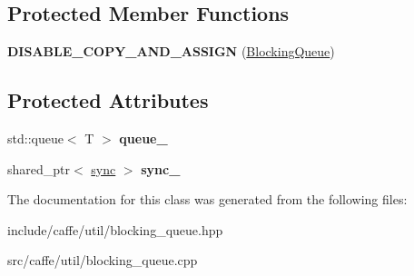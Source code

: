 \subsection*{Protected Member Functions}
\begin{DoxyCompactItemize}
\item 
{\bfseries D\+I\+S\+A\+B\+L\+E\+\_\+\+C\+O\+P\+Y\+\_\+\+A\+N\+D\+\_\+\+A\+S\+S\+I\+GN} (\hyperlink{classcaffe_1_1BlockingQueue}{Blocking\+Queue})\hypertarget{classcaffe_1_1BlockingQueue_afbc6f67dfc1571625178b46807e09139}{}\label{classcaffe_1_1BlockingQueue_afbc6f67dfc1571625178b46807e09139}

\end{DoxyCompactItemize}
\subsection*{Protected Attributes}
\begin{DoxyCompactItemize}
\item 
std\+::queue$<$ T $>$ {\bfseries queue\+\_\+}\hypertarget{classcaffe_1_1BlockingQueue_a1e9edbd83dcf94ae3c4aeb7300ae6a5a}{}\label{classcaffe_1_1BlockingQueue_a1e9edbd83dcf94ae3c4aeb7300ae6a5a}

\item 
shared\+\_\+ptr$<$ \hyperlink{classcaffe_1_1BlockingQueue_1_1sync}{sync} $>$ {\bfseries sync\+\_\+}\hypertarget{classcaffe_1_1BlockingQueue_a38023bc1eb798189b7c392d00630be9e}{}\label{classcaffe_1_1BlockingQueue_a38023bc1eb798189b7c392d00630be9e}

\end{DoxyCompactItemize}


The documentation for this class was generated from the following files\+:\begin{DoxyCompactItemize}
\item 
include/caffe/util/blocking\+\_\+queue.\+hpp\item 
src/caffe/util/blocking\+\_\+queue.\+cpp\end{DoxyCompactItemize}
